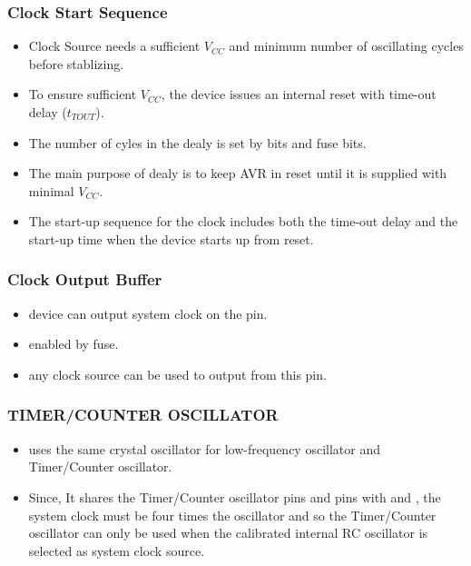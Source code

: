\documentclass{article}
\begin{document}
\subsubsection*{Clock Start Sequence}
\begin{itemize}
    \item Clock Source needs a sufficient $V_{CC}$ and minimum number of oscillating cycles before stablizing.
    \item To ensure sufficient $V_{CC}$, the device issues an internal reset with time-out delay ($t_{TOUT}$).
    \item The number of cyles in the dealy is set by  bits and  fuse bits.
    \item The main purpose of dealy is to keep AVR in reset until it is supplied with minimal $V_{CC}$.
    \item The start-up sequence for the clock includes both the time-out delay and the start-up time when the device starts up from
    reset.
\end{itemize}

\subsubsection*{Clock Output Buffer}
\begin{itemize}
    \item device can output system clock on the  pin.
    \item enabled by  fuse.
    \item any clock source can be used to output from this pin.
\end{itemize}

\subsubsection*{TIMER/COUNTER OSCILLATOR}
\begin{itemize}
    \item uses the same crystal oscillator for low-frequency oscillator and Timer/Counter oscillator.
    \item Since, It shares the Timer/Counter oscillator pins   and  pins with  and , the system clock must be four times the oscillator and so the Timer/Counter oscillator can only be used when the calibrated internal RC oscillator is selected as system clock source.
\end{itemize}
\end{document}
